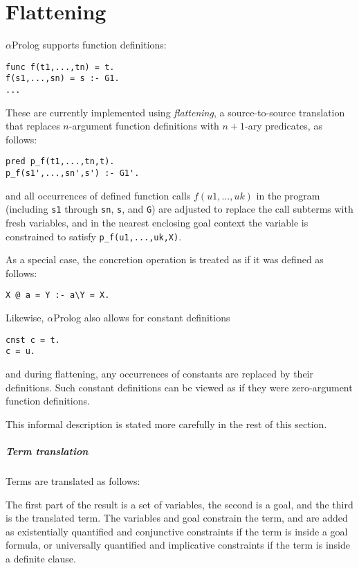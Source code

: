 \documentclass[draft,12pt]{report}
\newcommand{\aprolog}{$\alpha${Prolog}\xspace}
\newcommand{\SB}[1]{\llbracket #1 \rrbracket}
\begin{document}
\chapter{Flattening}
\label{ch:flattening}

\aprolog supports function definitions:
\begin{verbatim}
func f(t1,...,tn) = t.
f(s1,...,sn) = s :- G1.
...
\end{verbatim}
These are currently implemented using \emph{flattening}, a
source-to-source translation that replaces $n$-argument function
definitions with $n+1$-ary predicates, as follows:
\begin{verbatim}
pred p_f(t1,...,tn,t).
p_f(s1',...,sn',s') :- G1'.
\end{verbatim}
and all occurrences of defined function calls $f(u1,...,uk)$ in the program
(including \verb|s1| through \verb|sn|, \verb|s|, and \verb|G|) are
adjusted to replace the call subterms with fresh variables, and in the
nearest enclosing goal context the variable is constrained to satisfy
\verb|p_f(u1,...,uk,X)|.

As a special case, the concretion operation is treated as if it was defined as follows:
\begin{verbatim}
X @ a = Y :- a\Y = X.
\end{verbatim}

Likewise, \aprolog also allows for constant definitions
\begin{verbatim}
cnst c = t.
c = u.
\end{verbatim}
and during flattening, any occurrences of constants are replaced by
their definitions.  Such constant definitions can be viewed as if they
were zero-argument function definitions.

This informal description is stated more carefully in the rest of this
section.

\newcommand{\gflat}[1]{\mathcal{G}\SB{#1}}
\newcommand{\dflat}[1]{\mathcal{D}\SB{#1}}
\newcommand{\declflat}[1]{\SB{#1}}
\newcommand{\tflat}[4]{#1 \Rightarrow #2,#3,#4}
\newcommand{\pred}{\mathsf{pred}}
\newcommand{\func}{\mathsf{func}}

\paragraph{Term translation} Terms are translated as follows:

The first part of the result is a set of variables, the second is a
goal, and the third is the translated term.  The variables and goal
constrain the term, and are added as existentially quantified and
conjunctive constraints if the term is inside a goal formula, or
universally quantified and implicative constraints if the term is
inside a definite clause.
\end{document}
